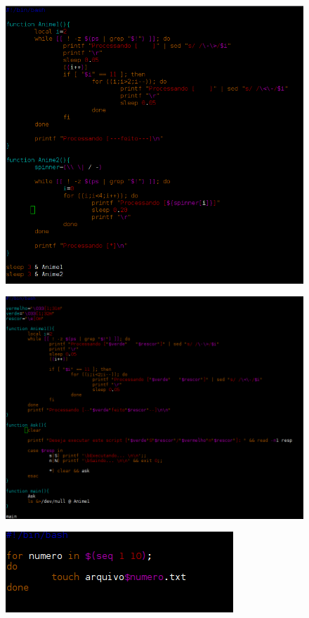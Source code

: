 \documentclass[
	12pt,				%
	openany,			%
	a4paper,			%
	chapter=TITLE,		%
	section=TITLE,		%
	english,
	brazil				%
]{abntex2}
\begin{document}
\begin{figure}[H]
  \centering
  \includegraphics[scale=0.5]{arquivo2.png}
\end{figure}


\begin{figure}[H]
  \centering
  \includegraphics[scale=0.5]{arquivo3.png}
\end{figure}

\begin{figure}[H]
  \centering
  \includegraphics[scale=1]{arquivo4.png}
\end{figure}
\end{document}
